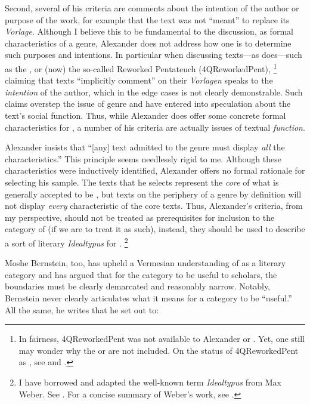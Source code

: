 Second, several of his criteria are comments about the intention of the author or purpose of the work, for example that the \rwb text was not ``meant'' to replace its \emph{Vorlage}. Although I believe this to be fundamental to the discussion, as formal characteristics of a genre, Alexander does not address how one is to determine such purposes and intentions.  In particular when discussing texts---as \vermes does---such as the \pTarg, or (now) the so-called Reworked Pentateuch (4QReworkedPent),%
    \footnote{%
        In fairness, 4QReworkedPent was not available to Alexander or \vermes. Yet, one still may wonder why   the \lxx or \sampent are not included. On the status of 4QReworkedPent as \rwb, see 
        \cite{zahn2011} and 
        \cite{zahn_dsd2008}.}
claiming that \rwb texts ``implicitly comment'' on their \emph{Vorlagen} speaks to the \emph{intention} of the author, which in the edge cases is not clearly demonstrable. Such claims overstep the issue of genre and have entered into speculation about the text's social function. Thus, while Alexander does offer some concrete formal characteristics for \rwb, a number of his criteria are actually issues of textual \emph{function}.

Alexander insists that ``[any] text admitted to the genre must display \emph{all} the characteristics.''%
    \autocite[119 n. 11]{alexander_carson-williamson1988}
This principle seems needlessly rigid to me. Although these characteristics were inductively identified,  Alexander offers no formal rationale for selecting his sample. The texts that he selects represent the \emph{core} of what is generally accepted to be \rwb, but texts on the periphery of a genre by definition will not display \emph{every} characteristic of the core texts. Thus, Alexander's criteria, from my perspective, should not be treated as prerequisites for inclusion to the category of \rwb (if we are to treat it as such), instead, they should be used to describe a sort of literary \emph{Idealtypus} for \rwb.%
    \footnote{%
        I have borrowed and adapted the well-known term \emph{Idealtypus} from Max Weber. See 
        \cite{weber1978}. For a concise summary of Weber's work, see 
        \cite[12--16]{smith-riley2009}.}

Moshe Bernstein, too, has upheld a Vermesian understanding of \rwb as a literary category and has argued that for the category to be useful to scholars, the boundaries must be clearly demarcated and reasonably narrow.%
    \autocite{bernstein_textus2005}
Notably, Bernstein never clearly articulates what it means for a category to be ``useful.'' All the same, he writes that he set out to: 

